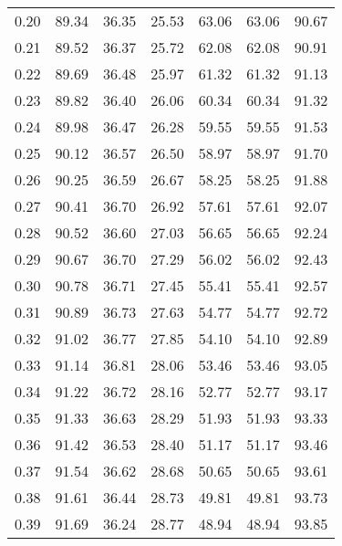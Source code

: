 \begin{tabular}{|c|c|c|c|c|c|c|}
      0.20 &     89.34 &     36.35 &      25.53 &   63.06 &      63.06 &         90.67 \\
      0.21 &     89.52 &     36.37 &      25.72 &   62.08 &      62.08 &         90.91 \\
      0.22 &     89.69 &     36.48 &      25.97 &   61.32 &      61.32 &         91.13 \\
      0.23 &     89.82 &     36.40 &      26.06 &   60.34 &      60.34 &         91.32 \\
      0.24 &     89.98 &     36.47 &      26.28 &   59.55 &      59.55 &         91.53 \\
      0.25 &     90.12 &     36.57 &      26.50 &   58.97 &      58.97 &         91.70 \\
      0.26 &     90.25 &     36.59 &      26.67 &   58.25 &      58.25 &         91.88 \\
      0.27 &     90.41 &     36.70 &      26.92 &   57.61 &      57.61 &         92.07 \\
      0.28 &     90.52 &     36.60 &      27.03 &   56.65 &      56.65 &         92.24 \\
      0.29 &     90.67 &     36.70 &      27.29 &   56.02 &      56.02 &         92.43 \\
      0.30 &     90.78 &     36.71 &      27.45 &   55.41 &      55.41 &         92.57 \\
      0.31 &     90.89 &     36.73 &      27.63 &   54.77 &      54.77 &         92.72 \\
      0.32 &     91.02 &     36.77 &      27.85 &   54.10 &      54.10 &         92.89 \\
      0.33 &     91.14 &     36.81 &      28.06 &   53.46 &      53.46 &         93.05 \\
      0.34 &     91.22 &     36.72 &      28.16 &   52.77 &      52.77 &         93.17 \\
      0.35 &     91.33 &     36.63 &      28.29 &   51.93 &      51.93 &         93.33 \\
      0.36 &     91.42 &     36.53 &      28.40 &   51.17 &      51.17 &         93.46 \\
      0.37 &     91.54 &     36.62 &      28.68 &   50.65 &      50.65 &         93.61 \\
      0.38 &     91.61 &     36.44 &      28.73 &   49.81 &      49.81 &         93.73 \\
      0.39 &     91.69 &     36.24 &      28.77 &   48.94 &      48.94 &         93.85 \\

\end{tabular}
